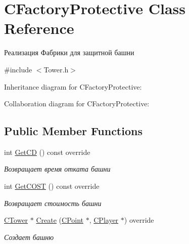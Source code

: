 \hypertarget{classCFactoryProtective}{}\section{C\+Factory\+Protective Class Reference}
\label{classCFactoryProtective}


Реализация Фабрики для защитной башни  




{\ttfamily \#include $<$Tower.\+h$>$}



Inheritance diagram for C\+Factory\+Protective\+:


Collaboration diagram for C\+Factory\+Protective\+:
\subsection*{Public Member Functions}
\begin{DoxyCompactItemize}
\item 
int \hyperlink{classCFactoryProtective_ac897b436cbf02acac41ef315c9775840}{Get\+CD} () const override\hypertarget{classCFactoryProtective_ac897b436cbf02acac41ef315c9775840}{}\label{classCFactoryProtective_ac897b436cbf02acac41ef315c9775840}

\begin{DoxyCompactList}\small\item\em Возвращает время отката башни \end{DoxyCompactList}\item 
int \hyperlink{classCFactoryProtective_a82770b798291fdff5a4b837b5b24ed0b}{Get\+C\+O\+ST} () const override\hypertarget{classCFactoryProtective_a82770b798291fdff5a4b837b5b24ed0b}{}\label{classCFactoryProtective_a82770b798291fdff5a4b837b5b24ed0b}

\begin{DoxyCompactList}\small\item\em Возвращает стоимость башни \end{DoxyCompactList}\item 
\hyperlink{classCTower}{C\+Tower} $\ast$ \hyperlink{classCFactoryProtective_a84e8dcb77e173bfff5f2efb329f142ae}{Create} (\hyperlink{classCPoint}{C\+Point} $\ast$, \hyperlink{classCPlayer}{C\+Player} $\ast$) override
\begin{DoxyCompactList}\small\item\em Создает башню \end{DoxyCompactList}\end{DoxyCompactItemize}


